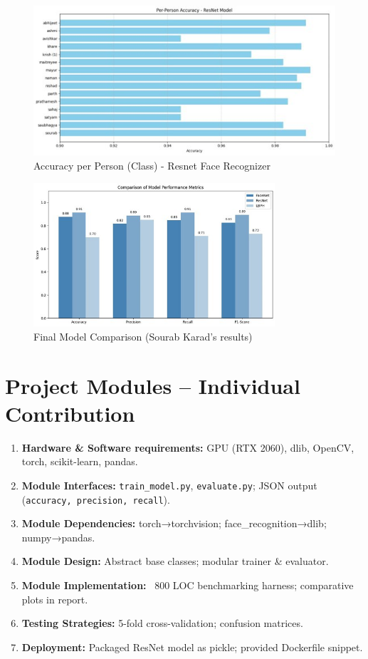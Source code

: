 \documentclass[openany]{report}
\begin{document}
\begin{figure}[H]
  \centering
  \includegraphics[width=.95\textwidth]{../imgs/model_3_per_person.jpg}
  \caption{Accuracy per Person (Class) - Resnet Face Recognizer}
\end{figure}

\begin{figure}[H]
    \centering
    \includegraphics[width=0.8\textwidth]{../imgs/final_model_comp.jpg}
    \caption{Final Model Comparison (Sourab Karad’s results)} 
    \label{fig:sourab_graph}
\end{figure}
\section{Project Modules – Individual Contribution}
\begin{enumerate}
  \item \textbf{Hardware \& Software requirements:} GPU (RTX 2060), dlib, OpenCV, torch, scikit-learn, pandas.
  \item \textbf{Module Interfaces:} \texttt{train\_model.py}, \texttt{evaluate.py}; JSON output (\texttt{accuracy, precision, recall}).
  \item \textbf{Module Dependencies:} torch→torchvision; face\_recognition→dlib; numpy→pandas.
  \item \textbf{Module Design:} Abstract base classes; modular trainer \& evaluator.
  \item \textbf{Module Implementation:} ~800 LOC benchmarking harness; comparative plots in report.
  \item \textbf{Testing Strategies:} 5-fold cross-validation; confusion matrices.
  \item \textbf{Deployment:} Packaged ResNet model as pickle; provided Dockerfile snippet.
\end{enumerate}
\end{document}

